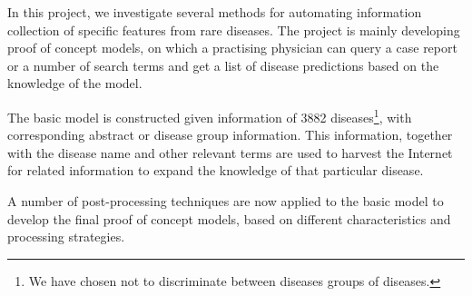 \documentclass[10pt,letterpaper,final]{article}
\begin{document}

In this project, we investigate several methods for automating
information collection of specific features from rare diseases. The
project is mainly developing proof of concept models, on which a
practising physician can query a case report or a number of search terms
and get a list of disease predictions based on the knowledge of the
model.

The basic model is constructed given information of 3882 diseases\footnote{We have chosen not to discriminate between diseases groups of diseases.}, with
corresponding abstract or disease group information. This information,
together with the disease name and other relevant terms are used to
harvest the Internet for related information to expand the knowledge of
that particular disease.

A number of post-processing techniques are now applied to the basic
model to develop the final proof of concept models, based on different
characteristics and processing strategies.





\end{document}
